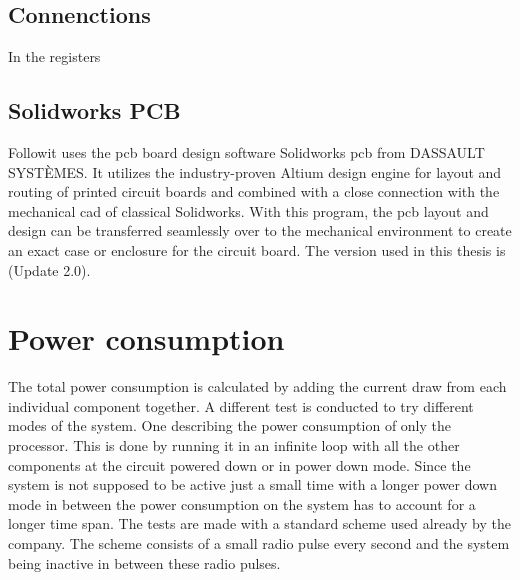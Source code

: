 \subsection{Connenctions}
 In the registers 


\newpage
\subsection{Solidworks PCB}
Followit uses the \gls{pcb} board design software Solidworks \gls{pcb} from DASSAULT SYSTÈMES. It utilizes the industry-proven Altium design engine for layout and routing of printed circuit boards and combined with a close connection with the mechanical \gls{cad} of classical Solidworks. With this program, the \gls{pcb} layout and design can be transferred seamlessly over to the mechanical environment to create an exact case or enclosure for the circuit board. The version used in this thesis is (Update 2.0).


\section{Power consumption}
 The total power consumption is calculated by adding the current draw from each individual component together.  A different test is conducted to try different modes of the system. One describing the power consumption of only the processor. This is done by running it in an infinite loop with all the other components at the circuit powered down or in power down mode. Since the system is not supposed to be active just a small time with a longer power down mode in between the power consumption on the system has to account for a longer time span. The tests are made with a standard scheme used already by the company. The scheme consists of a small radio pulse every second and the system being inactive in between these radio pulses. 
